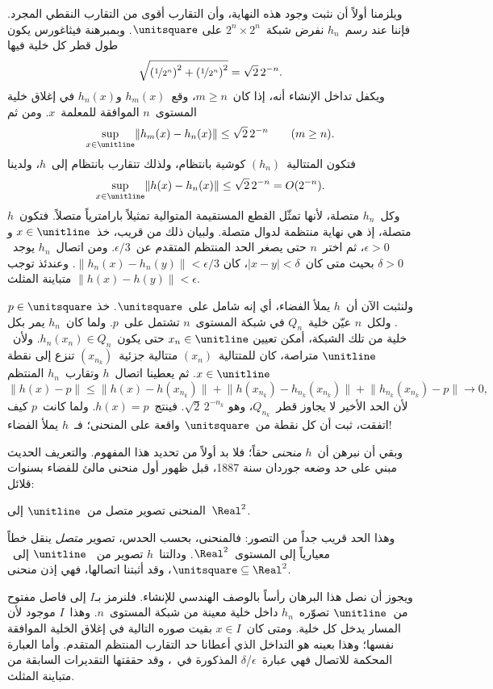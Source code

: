 \documentclass[../../../include/open-logic-section]{subfiles}
\begin{document}
ويلزمنا أولاً أن نثبت وجود هذه النهاية، وأن التقارب أقوى من التقارب
النقطي المجرد. فإننا عند رسم~$h_n$ نفرض شبكة~$2^n \times 2^n$ على
$\unitsquare$. وبمبرهنة فيثاغورس يكون طول قطر كل خلية فيها
\[
\sqrt{\left(\nicefrac{1}{2^{n}}\right)^2+\left(\nicefrac{1}{2^{n}}\right)^2}
= \sqrt{2}\,2^{-n}.
\]
ويكفل تداخل الإنشاء أنه، إذا كان~$m \geq n$، وقع~$h_m(x)$ و$h_n(x)$ في
إغلاق خلية المستوى~$n$ الموافقة للمعلمة~$x$. ومن ثم
\[
\sup_{x \in \unitline}\lVert h_m(x)-h_n(x)\rVert
\leq \sqrt{2}\,2^{-n}\qquad(m \geq n).
\]
فتكون المتتالية~$(h_n)$ كوشية بانتظام، ولذلك تتقارب بانتظام إلى~$h$،
ولدينا
\[
\sup_{x \in \unitline}\lVert h(x)-h_n(x)\rVert
\leq \sqrt{2}\,2^{-n} = O(2^{-n}).
\]
وكل~$h_n$ متصلة، لأنها تمثّل القطع المستقيمة المتوالية تمثيلاً بارامترياً
متصلاً. فتكون~$h$ متصلة، إذ هي نهاية منتظمة لدوال متصلة. ولبيان ذلك من
قريب، خذ~$x \in \unitline$ و$\epsilon>0$، ثم اختر~$n$ حتى يصغر الحد
المنتظم المتقدم عن~$\epsilon/3$. ومن اتصال~$h_n$ يوجد~$\delta>0$ بحيث
متى كان~$|x-y|<\delta$، كان
$\lVert h_n(x)-h_n(y)\rVert<\epsilon/3$. وعندئذ توجب متباينة المثلث
$\lVert h(x)-h(y)\rVert<\epsilon$.

ولنثبت الآن أن~$h$ يملأ الفضاء، أي إنه شامل على~$\unitsquare$. خذ
$p \in \unitsquare$. ولكل~$n$ عيّن خلية~$Q_n$ في شبكة المستوى~$n$
تشتمل على~$p$. ولما كان~$h_n$ يمر بكل خلية من تلك الشبكة، أمكن تعيين
$x_n \in \unitline$ حتى يكون~$h_n(x_n) \in Q_n$. ولأن~$\unitline$
متراصة، كان للمتتالية~$(x_n)$ متتالية جزئية~$(x_{n_k})$ تنزع إلى نقطة
$x \in \unitline$. ثم يعطينا اتصال~$h$ وتقارب~$h_n$ المنتظم
\[
\lVert h(x)-p\rVert
\leq \lVert h(x)-h(x_{n_k})\rVert
 + \lVert h(x_{n_k})-h_{n_k}(x_{n_k})\rVert
 + \lVert h_{n_k}(x_{n_k})-p\rVert \longrightarrow 0,
\]
لأن الحد الأخير لا يجاوز قطر~$Q_{n_k}$، وهو
$\sqrt{2}\,2^{-n_k}$. فينتج~$h(x)=p$. ولما كانت~$p$ كيف اتفقت، ثبت أن
كل نقطة من~$\unitsquare$ واقعة على المنحنى؛ فـ~$h$ يملأ الفضاء!

وبقي أن نبرهن أن~$h$ \emph{منحنى} حقاً؛ فلا بد أولاً من تحديد هذا
المفهوم. والتعريف الحديث مبني على حد وضعه جوردان سنة 1887، قبل ظهور أول
منحنى مالئ للفضاء بسنوات قلائل:

\begin{defn}
المنحنى تصوير متصل من~$\unitline$ إلى~$\Real^2$.
\end{defn}

وهذا الحد قريب جداً من التصور: فالمنحنى، بحسب الحدس، تصوير \emph{متصل}
ينقل خطاً معيارياً إلى المستوى~$\Real^2$. ودالتنا~$h$ تصوير من
~$\unitline$ إلى~$\unitsquare \subseteq \Real^2$، وقد أثبتنا اتصالها،
فهي إذن منحنى.

ويجوز أن نصل هذا البرهان رأساً بالوصف الهندسي للإنشاء. فلنرمز بـ$I$ إلى
فاصل مفتوح من~$\unitline$ تصوّره~$h_n$ داخل خلية معينة من شبكة
المستوى~$n$. وهذا~$I$ موجود لأن المسار يدخل كل خلية. ومتى كان~$x \in I$
بقيت صوره التالية في إغلاق الخلية الموافقة نفسها؛ وهذا بعينه هو التداخل
الذي أعطانا حد التقارب المنتظم المتقدم. وأما العبارة المحكمة للاتصال فهي
عبارة~$\epsilon$/$\delta$ المذكورة في~، وقد حققتها
التقديرات السابقة من متباينة المثلث.
\end{document}
